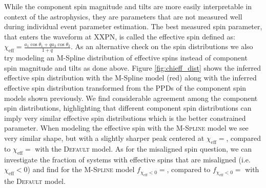 While the component spin magnitude and tilts are more easily interpretable in context of the astrophysics, they are parameters that 
are not measured well during individual event parameter estimation. The best measured spin parameter, that enters the waveform at XXPN, is 
called the effective spin defined as: $\chi_\mathrm{eff} = \frac{a_1\cos{\theta_1} + qa_2\cos{\theta_2}}{1+q}$. As an alternative check 
on the spin distributions we also try modeling an M-Spline distribution of effective spins instead of component spin magnitude and tilts 
as done above. Figure \ref{fig:chieff_dist} shows the inferred effective spin distribution with the M-Spline model (red) along with the 
inferred effective spin distribution transformed from the PPDs of the component spin models shown previously. We find considerable agreement 
among the component spin distributions, highlighting that different component spin distributions can imply very similar effective spin 
distributions which is the better constrained parameter. When modeling the effective spin with the \textsc{M-Spline} model we see very similar 
shape, but with a slightly sharper peak centered at $\chi_\mathrm{eff}=$\result{$\CIPlusMinus{\macros[ChiEffective][chieff][PeakChiEff]}$}, compared to 
$\chi_\mathrm{eff}=$\result{$\CIPlusMinus{\macros[ChiEffective][default][PeakChiEff]}$} with the \textsc{Default} model. As for the misaligned spin question, 
we can investigate the fraction of systems with effective spins that are misaligned (i.e. $\chi_\mathrm{eff}<0$) and find for the \textsc{M-Spline} 
model $f_{\chi_\mathrm{eff}<0}=$\result{$\CIPlusMinus{\macros[ChiEffective][chieff][FracBelow0]}$}, compared to 
$f_{\chi_\mathrm{eff}<0}=$\result{$\CIPlusMinus{\macros[ChiEffective][default][FracBelow0]}$} with the \textsc{Default} model.
